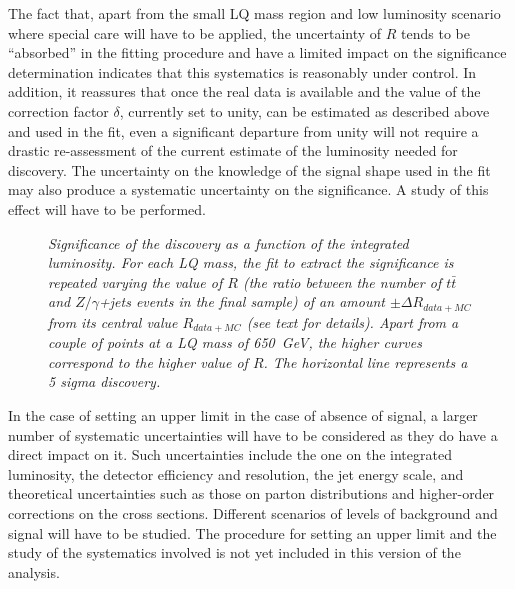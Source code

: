\documentclass[colclass=cmspaper]{combine}
\begin{document}
\begin{linenumbers}
The fact that, apart from the small LQ mass region and low luminosity scenario where special care
will have to be applied, the uncertainty 
of $R$ tends to be ``absorbed'' in the fitting procedure and have a limited impact on the 
significance determination indicates that this systematics is reasonably under control. 
In addition, it reassures that once the real data is available and the value of the correction 
factor $\delta$, currently set to unity, can be estimated as described above and used in the fit,
even a significant departure from unity will not require a drastic re-assessment of
the current estimate of the luminosity needed for discovery.
The uncertainty on the knowledge of the signal shape used in the fit may also produce a systematic
uncertainty on the significance. A study of this effect will have to be performed.

 \begin{figure}
   \begin{center}
     \caption{\small \sl Significance of the discovery as a function of the integrated luminosity.
       For each LQ mass, the fit to extract the significance is repeated varying the value of $R$
       (the ratio between the number of $t\bar{t}$ and $Z/\gamma$+jets events in the final sample)
       of an amount $\pm\Delta R_{data+MC}$ from its central value $R_{data+MC}$ 
       (see text for details).
       Apart from a couple of points at a LQ mass of 650~GeV, the higher curves correspond to
       the higher value of $R$. 
       The horizontal line represents a 5 sigma discovery.}
     \label{fig:sign_vs_Lint_sysR}
   \end{center}
 \end{figure}

In the case of setting an upper limit in the case of absence of signal, a larger number of systematic
uncertainties will have to be considered as they do have a direct impact on it. 
Such uncertainties include the one on the integrated luminosity, the detector efficiency and 
resolution, the jet energy scale, and theoretical uncertainties such as those on parton distributions
and higher-order corrections on the cross sections. Different scenarios of levels of background
and signal will have to be studied. The procedure for setting an upper limit and the study of the 
systematics involved is not yet included in this version of the analysis.





\end{linenumbers}
\end{document}
